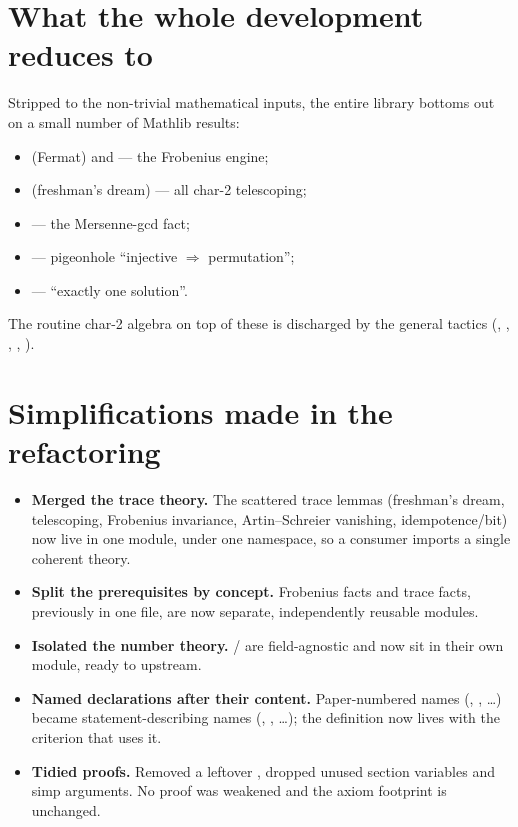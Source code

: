 \documentclass[11pt]{article}
\theoremstyle{definition}
\begin{document}
\section{What the whole development reduces to}

Stripped to the non-trivial mathematical inputs, the entire library bottoms out
on a small number of Mathlib results:
\begin{itemize}[leftmargin=1.4em,itemsep=1pt]
\item {} (Fermat) and  --- the
      Frobenius engine;
\item {} (freshman's dream) --- all char-2 telescoping;
\item {} --- the Mersenne-gcd fact;
\item {} --- pigeonhole ``injective
      $\Rightarrow$ permutation'';
\item {} --- ``exactly one solution''.
\end{itemize}
The routine char-2 algebra on top of these is discharged by the general tactics
(, , , , ).

\section{Simplifications made in the refactoring}

\begin{itemize}[leftmargin=1.4em,itemsep=2pt]
\item \textbf{Merged the trace theory.}  The scattered trace lemmas
      (freshman's dream, telescoping, Frobenius invariance, Artin--Schreier
      vanishing, idempotence/bit) now live in one  module,
      under one namespace, so a consumer imports a single coherent theory.
\item \textbf{Split the prerequisites by concept.}  Frobenius facts and trace
      facts, previously in one  file, are now separate,
      independently reusable modules.
\item \textbf{Isolated the number theory.}  /%
       are field-agnostic and now sit in their own
       module, ready to upstream.
\item \textbf{Named declarations after their content.}  Paper-numbered names
      (, , \dots) became statement-describing names
      (, , \dots); the
       definition now lives with the criterion that uses it.
\item \textbf{Tidied proofs.}  Removed a leftover , dropped unused
      section variables and simp arguments.  No proof was weakened and the
      axiom footprint is unchanged.
\end{itemize}
\end{document}
